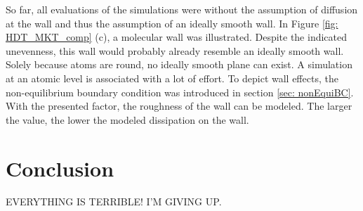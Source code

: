 So far, all evaluations of the simulations were without the assumption of diffusion at the wall and thus the assumption of an ideally smooth wall. In Figure \ref{fig: HDT_MKT_comp} (c), a molecular wall was illustrated. Despite the indicated unevenness, this wall would probably already resemble an ideally smooth wall. Solely because atoms are round, no ideally smooth plane can exist. A simulation at an atomic level is associated with a lot of effort. To depict wall effects, the non-equilibrium boundary condition was introduced in section \ref{sec: nonEquiBC}. With the presented factor, the roughness of the wall can be modeled. The larger the value, the lower the modeled dissipation on the wall.

\section{Conclusion}
EVERYTHING IS TERRIBLE!
I'M GIVING UP.
